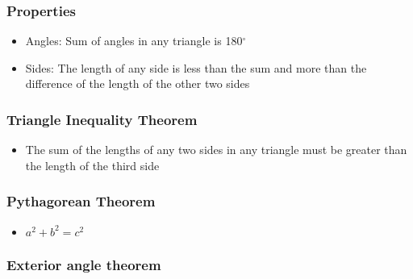 \documentclass{article}
\begin{document}
        \subsubsection{Properties}
            \begin{itemize}
                \item Angles: Sum of angles in any triangle is 180$^\circ$
                \item Sides: The length of any side is less than the sum and more than the difference of the length of the other two sides
            \end{itemize}

        \subsubsection{Triangle Inequality Theorem}
            \begin{itemize}
                \item The sum of the lengths of any two sides in any triangle must be greater than the length of the third side
            \end{itemize}

        \subsubsection{Pythagorean Theorem}
            \hspace{40pt}
            
            \begin{itemize}
                \item $a^2 + b^2 = c^2$
            \end{itemize}

        \subsubsection{Exterior angle theorem}   
            
\end{document}

